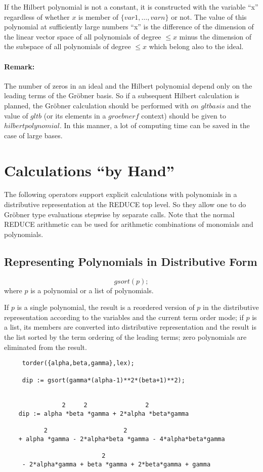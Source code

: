 If the Hilbert polynomial is not a constant, it is constructed with the
variable ``x'' regardless of whether $x$ is member of
$\{var1, \ldots , varn\}$ or not. The value of this polynomial at
sufficiently large numbers  ``x'' is the difference
of the dimension of the linear vector space of all polynomials of degree
$ \leq x $ minus the dimension of the subspace of all polynomials of
degree $\leq x $ which belong also to the ideal.

\paragraph{Remark:} The number of zeros in an ideal and the
Hilbert polynomial depend only on the leading terms of the
Gr\"obner basis. So if a subsequent Hilbert calculation is planned, the
Gr\"obner calculation should be performed with $on$ $gltbasis$ and
the value of $gltb$ (or its elements in a $groebnerf$ context) should be
given to $hilbertpolynomial$.  In this manner, a lot of computing time can be
saved in the case of large bases.

\section{Calculations ``by Hand''}
The following operators support explicit calculations with
polynomials in a distributive representation at the REDUCE top level.
So they allow one to do Gr\"obner type evaluations stepwise by
separate calls. Note that the normal REDUCE arithmetic can be used
for arithmetic combinations of monomials and polynomials.

\subsection{Representing Polynomials in Distributive Form}
\[
 gsort (p);
\]
where $p$ is a polynomial or a list of polynomials.

If $p$ is a single polynomial, the result is a reordered version of $p$
in the distributive representation according to the variables and the
current term order mode; if $p$ is a list, its members are converted
into distributive representation and the result is the list sorted by
the term ordering of the leading terms; zero polynomials are
eliminated from the result.

\begin{verbatim}
     torder({alpha,beta,gamma},lex);

     dip := gsort(gamma*(alpha-1)**2*(beta+1)**2);


                2     2                2
    dip := alpha *beta *gamma + 2*alpha *beta*gamma

           2                     2
    + alpha *gamma - 2*alpha*beta *gamma - 4*alpha*beta*gamma

                           2
     - 2*alpha*gamma + beta *gamma + 2*beta*gamma + gamma

 \end{verbatim}

